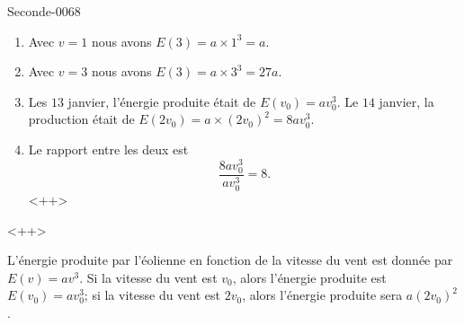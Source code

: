 
\begin{corrige}{Seconde-0068}

    \begin{enumerate}
        \item
            Avec \( v=1\) nous avons \( E(3)=a\times 1^3=a\).
        \item
            Avec \( v=3\) nous avons \( E(3)=a\times 3^3=27a\).
        \item
            Les \( 13\) janvier, l'énergie produite était de \( E(v_0)=av_0^3\). Le \( 14\) janvier, la production était de \( E(2v_0)=a\times (2v_0)^2=8av_0^3\).
        \item
            Le rapport entre les deux est
            \begin{equation}
                \frac{ 8av_0^3 }{ av_0^3 }=8.
            \end{equation}
            <++>
    \end{enumerate}
    <++>

    L'énergie produite par l'éolienne en fonction de la vitesse du vent est donnée par \( E(v)=av^3\). Si la vitesse du vent est \( v_0\), alors l'énergie produite est \( E(v_0)=av_0^3\); si la vitesse du vent est \( 2v_0\), alors l'énergie produite sera \( a(2v_0)^2\).

\end{corrige}
